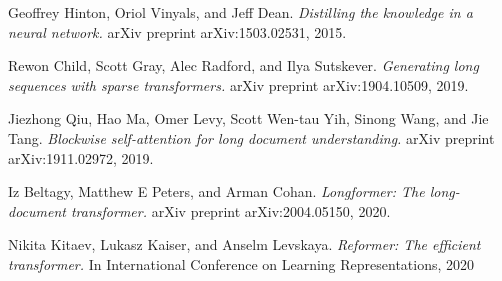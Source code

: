 \documentclass[12pt,a4paper,oneside]{report}
\numberwithin{equation}{section}
\begin{document}
\begin{thebibliography}{99}
Geoffrey Hinton, Oriol Vinyals, and Jeff Dean.
\emph{Distilling the knowledge in a neural network.}
arXiv preprint arXiv:1503.02531, 2015.

Rewon Child, Scott Gray, Alec Radford, and Ilya Sutskever.
\emph{Generating long sequences with sparse transformers.}
arXiv preprint arXiv:1904.10509, 2019.

Jiezhong Qiu, Hao Ma, Omer Levy, Scott Wen-tau Yih, Sinong Wang, and Jie Tang. 
\emph{Blockwise self-attention for long document understanding.}
arXiv preprint arXiv:1911.02972, 2019.

Iz Beltagy, Matthew E Peters, and Arman Cohan. 
\emph{Longformer: The long-document transformer.}
arXiv preprint arXiv:2004.05150, 2020.

Nikita Kitaev, Lukasz Kaiser, and Anselm Levskaya. 
\emph{Reformer: The efficient transformer.} 
In International Conference on Learning Representations, 2020
	\end{thebibliography}
\end{document}

